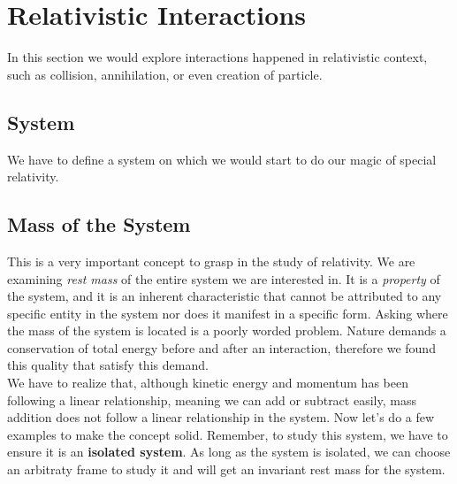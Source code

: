 \documentclass[11pt,letterpaper]{book}
\begin{document}
\section{Relativistic Interactions}
In this section we would explore interactions happened in relativistic context, such as collision, annihilation, or even creation of particle. 

\subsection{System}
We have to define a system on which we would start to do our magic of special relativity.

\subsection{Mass of the System} 
This is a very important concept to grasp in the study of relativity. We are examining \textit{rest mass} of the entire system we are interested in. It is a \textit{property} of the system, and it is an inherent characteristic that cannot be attributed to any specific entity in the system nor does it manifest in a specific form. Asking where the mass of the system is located is a poorly worded problem. Nature demands a conservation of total energy before and after an interaction, therefore we found this quality that satisfy this demand.\\

We have to realize that, although kinetic energy and momentum has been following a linear relationship, meaning we can add or subtract easily, mass addition does not follow a linear relationship in the system. Now let's do a few examples to make the concept solid. Remember, to study this system, we have to ensure it is an \textbf{isolated system}. As long as the system is isolated, we can choose an arbitraty frame to study it and will get an invariant rest mass for the system.  \\
\end{document}
